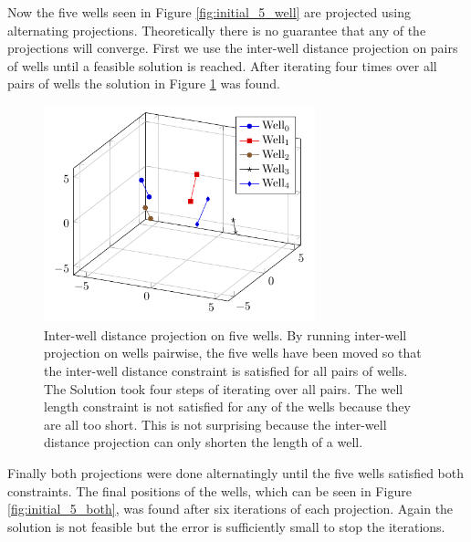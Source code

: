 Now the five wells seen in Figure \ref{fig:initial_5_well} 
are projected using alternating projections. Theoretically 
there is no guarantee that any of the projections will
converge.
%
First we use the inter-well distance projection on pairs
of wells until a feasible solution is reached. After iterating
four times over all pairs of wells the solution in Figure
\ref{fig:initial_5_well_distance} was found.
%
\begin{figure}[H]
	\centering
	\includegraphics[width=0.70\textwidth]{figures/interwell_distance/five_wells_moved.pdf}
	\caption{Inter-well distance projection on five wells. By running inter-well projection on 
											 wells pairwise, the five wells have been moved so 
											 that the inter-well distance constraint is satisfied 
											 for all pairs of wells. The Solution took four steps of 
											 iterating over all pairs. The well length constraint 
											 is not satisfied for any of the wells because they
											 are all too short. This is not surprising because the inter-well
											 distance projection can only shorten the length of a well.}
	\label{fig:initial_5_well_distance}
\end{figure}
%
%
Finally both projections were done alternatingly until
the five wells satisfied both constraints. The final
positions of the wells, which can be seen in Figure 
\ref{fig:initial_5_both}, was found after six iterations
of each projection. Again the solution is not feasible
but the error is sufficiently small to stop the iterations.
%
